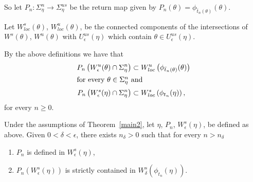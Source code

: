 \documentclass[AHL,Unicode,longabstracts,published]{cedram}
\begin{document}
So let $P_{n} : \Sigma_{\eta}^{n} \longrightarrow \Sigma_{\eta}^{us}$ be the return map given by $P_{n}(\theta) =\phi_{\bar{t}_{n}(\theta)}(\theta) $.

Let $W^{s}_{loc}(\theta)$, $W^{u}_{loc}(\theta)$, be the connected components of the intersections of $W^{s}(\theta)$, $W^{u}(\theta)$ with $U_{\epsilon}^{us}(\eta)$ which contain $\theta \in U_{\epsilon}^{us}(\eta)$.


By the above definitions we have that
\begin{align*}
P_{n}\left(W^{u}_{\epsilon}(\theta) \cap \Sigma_{\eta}^{n}\right)&\subset W^{u}_{loc}\left(\phi_{\bar{t}_{n}(\theta)}(\theta)\right)
\\
\intertext{for every $\theta \in \Sigma^{n}_{\eta}$ and}
P_{n}\left(W^{s}_{\epsilon}(\eta) \cap \Sigma_{\eta}^{n}\right)&\subset W^{s}_{loc}\left(\phi_{t_{n}}(\eta)\right),
\end{align*}
for every $n \geq 0$.
\pagebreak
\begin{lemm}\label{contraction}
Under the assumptions of Theorem~\ref{main2}, let $\eta$, $P_{n}$, $W^{s}_{\epsilon}(\eta)$, be defined as above. Given $0 <\delta <\epsilon$, there exists $n_{\delta}>0$ such that for every $n >n_{\delta}$
\begin{enumerate}
\item \label{lemm8.3.1}$P_{n}$ is defined in $W^{s}_{\epsilon}(\eta)$,
\item \label{lemm8.3.2} $P_{n}(W^{s}_{\epsilon}(\eta))$ is strictly contained in $W^{s}_{\delta}(\phi_{t_{n}}(\eta)).$
\end{enumerate}
\end{lemm}
\end{document}
